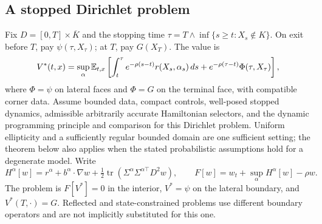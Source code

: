 \subsection{A stopped Dirichlet problem}
Fix $D=[0,T]\times\overline K$ and the stopping time $\tau=T\wedge\inf\{s\geq t:X_s\notin K\}$. On exit before $T$, pay $\psi(\tau,X_\tau)$; at $T$, pay $G(X_T)$. The value is
\begin{equation}\label{eq:stopped}
 V^*(t,x)=\sup_\alpha\mathbb E_{t,x}\left[\int_t^\tau e^{-\rho(s-t)}r(X_s,\alpha_s)\,ds
                   +e^{-\rho(\tau-t)}\Phi(\tau,X_\tau)\right],
\end{equation}
where $\Phi=\psi$ on lateral faces and $\Phi=G$ on the terminal face, with compatible corner data. Assume bounded data, compact controls, well-posed stopped dynamics, admissible arbitrarily accurate Hamiltonian selectors, and the dynamic programming principle and comparison for this Dirichlet problem. Uniform ellipticity and a sufficiently regular bounded domain are one sufficient setting; the theorem below also applies when the stated probabilistic assumptions hold for a degenerate model. Write
\[
 H^\alpha[w]=r^\alpha+b^\alpha\cdot\nabla w+\tfrac12
       \operatorname{tr}(\Sigma^\alpha\Sigma^{\alpha\top}D^2w),\qquad
 F[w]=w_t+\sup_\alpha H^\alpha[w]-\rho w.
\]
The problem is $F[V^*]=0$ in the interior, $V^*=\psi$ on the lateral boundary, and $V^*(T,\cdot)=G$. Reflected and state-constrained problems use different boundary operators and are not implicitly substituted for this one.

